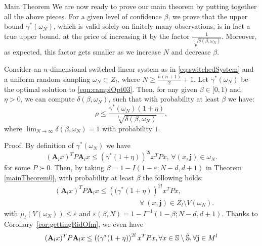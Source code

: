 \begin{subsection}{Main Theorem}
We are now ready to prove our main theorem by putting together all the above pieces. For a given level of confidence $\beta$, we prove that the upper bound $\gamma^{*}(\omega_N)$, which is valid solely on finitely many observations, is in fact a true upper bound, at the price of increasing it by the factor $\frac{1}{\sqrt[l]{\delta(\beta, \omega_N)}}$. Moreover, as expected, this factor gets smaller as we increase $N$ and decrease $\beta$.


\begin{thm}\label{thm:mainTheorem}
Consider an $n$-dimensional switched linear system as in \eqref{eq:switchedSystem} and a uniform random sampling $\omega_N \subset Z_l$, where $N \geq \frac{n(n+1)}{2}+1$. Let $\gamma^{*}(\omega_N) $ be the optimal solution to \eqref{eqn:campiOpt03}. Then, for any given $\beta \in [0,1)$ and $\eta > 0$, we can compute $\delta(\beta, \omega_N)$, such that with probability at least $\beta$ we have: $$\rho \leq \frac{\gamma^{*}(\omega_N) (1+ \eta)}{\sqrt[l]{\delta(\beta, \omega_N)}},$$ where $\lim_{N \to \infty}\delta(\beta, \omega_N) = 1$ with probability $1$.
\end{thm}
\begin{pf*}{Proof.}
By definition of $\gamma^{*}(\omega_N)$ we have
\begin{equation*}
(\mathbf{A}_l x)^T P \mathbf{A}_l x \leq (\gamma^{*}(1+\eta))^{2l} x^T P x,\, \forall (x, \mathbf{j}) \in \omega_N.
\end{equation*}
for some $P \succ 0$. Then, by taking $\beta = 1- I(1-\varepsilon; N-d, d+1)$ in Theorem \ref{mainTheorem0}, with probability at least $\beta$ the following holds:
\begin{equation*} 
\begin{aligned}
& (\mathbf{A}_l x)^T P \mathbf{A}_l x \leq  \left((\gamma^{*}(1+\eta) \right)^{2l} x^T P x, \\
& \qquad \qquad \qquad \qquad \qquad \qquad \forall\ (x,\mathbf{j}) \in Z_l \setminus V(\omega_N).
\end{aligned}
\end{equation*}
with $\mu_l(V(\omega_N)) \leq \varepsilon$ and $\varepsilon(\beta, N)=1- I^{-1}(1-\beta; N-d, d+1)$. Thanks to Corollary~\ref{cor:gettingRidOfm}, we even have
\begin{equation*} 
(\mathbf{A}_l x)^T P \mathbf{A}_l x \leq  \left( (\gamma^{*}(1+\eta) \right)^{2l} x^T P x, \forall x \in \sphere \setminus \tilde{\sphere}, \forall \mathbf{j} \in M^l

\end{equation*}
\end{pf*}
\end{subsection}

